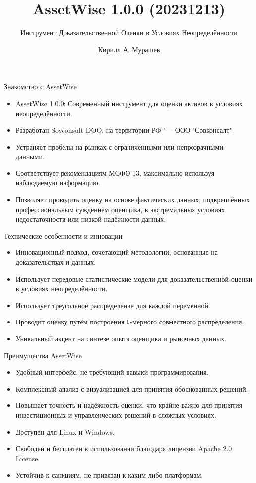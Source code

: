 \documentclass{beamer}
\title{AssetWise 1.0.0 (20231213)}
\subtitle{Инструмент Доказательственной Оценки в Условиях Неопределённости}
\author{\href{https://github.com/Kirill-Murashev}{Кирилл А. Мурашев}}
\institute{\href{https//sovconsult.tech}{Совконсалт ООО}, \href{https://en.wikipedia.org/wiki/Herceg_Novi}{Санкт-Петербург}}
\begin{document}
	
	\begin{frame}[plain]
		\maketitle
	\end{frame}

\begin{frame}{Знакомство с AssetWise}
	\begin{itemize}
		\item AssetWise 1.0.0: Современный инструмент для оценки активов в условиях неопределённости.
		\item Разработан Sovconsult DOO, на территории РФ "--- ООО "Совконсалт".
		\item Устраняет пробелы на рынках с ограниченными или непрозрачными данными.
		\item Соответствует рекомендациям МСФО 13, максимально используя наблюдаемую информацию.
		\item Позволяет проводить оценку на основе фактических данных, подкреплённых профессиональным суждением оценщика, в экстремальных условиях недостаточности или низкой надёжности данных.
	\end{itemize}
\end{frame}

\begin{frame}{Технические особенности и инновации}
	\begin{itemize}
		\item Инновационный подход, сочетающий методологии, основанные на доказательствах и данных.
		\item Использует передовые статистические модели для доказательственной оценки в условиях неопределённости.
		\item Использует треугольное распределение для каждой переменной.
		\item Проводит оценку путём построения k-мерного совместного распределения.
		\item Уникальный акцент на синтезе опыта оценщика и рыночных данных.
	\end{itemize}
\end{frame}

\begin{frame}{Преимущества AssetWise}
	\begin{itemize}
		\item Удобный интерфейс, не требующий навыки программирования.
		\item Комплексный анализ с визуализацией для принятия обоснованных решений.
		\item Повышает точность и надёжность оценки, что крайне важно для принятия инвестиционных и управленческих решений в сложных условиях.
		\item Доступен для Linux и Windows.
		\item Свободен и бесплатен в использовании благодаря лицензии Apache 2.0 License.
	    \item Устойчив к санкциям, не привязан к каким-либо платформам.
	\end{itemize}
\end{frame}
\end{document}
